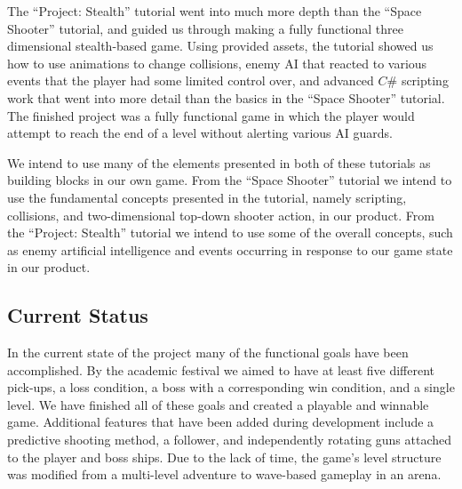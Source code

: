 \documentclass[12pt]{article}       %
\begin{document}
 The “Project: Stealth” tutorial went into much more depth than the “Space Shooter” tutorial, and guided us through making a fully functional three dimensional stealth-based game. Using provided assets, the tutorial showed us how to use animations to change collisions, enemy AI that reacted to various events that the player had some limited control over, and advanced $C\#$ scripting work that went into more detail than the basics in the “Space Shooter” tutorial. The finished project was a fully functional game in which the player would attempt to reach the end of a level without alerting various AI guards.

  We intend to use many of the elements presented in both of these tutorials as building blocks in our own game. From the “Space Shooter” tutorial we intend to use the fundamental concepts presented in the tutorial, namely scripting, collisions, and two-dimensional top-down shooter action, in our product. From the “Project: Stealth” tutorial we intend to use some of the overall concepts, such as enemy artificial intelligence and events occurring in response to our game state in our product.

\subsection{Current Status}

In the current state of the project many of the functional goals have been accomplished. By the academic festival we aimed to have at least five different pick-ups, a loss condition, a boss with a corresponding win condition, and a single level. We have finished all of these goals and created a playable and winnable game. Additional features that have been added during development include a predictive shooting method, a follower, and independently rotating guns attached to the player and boss ships. Due to the lack of time, the game's level structure was modified from a multi-level adventure to wave-based gameplay in an arena.
\end{document}
